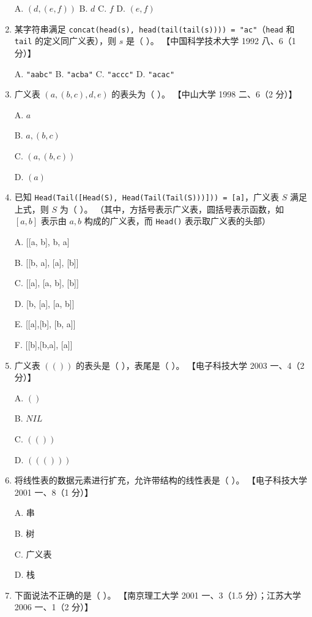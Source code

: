 \documentclass[lang=cn,newtx,10pt,scheme=chinese]{../../elegantbook}
\begin{document}
\begin{enumerate}
    A. $(d, (e, f))$ \quad B. $d$ \quad C. $f$ \quad D. $(e, f)$  

    \item 某字符串满足 \texttt{concat(head(s), head(tail(tail(s)))) = "ac"}（\texttt{head} 和 \texttt{tail} 的定义同广义表），则 $s$ 是（ ）。  
    【中国科学技术大学 1992 八、6（1 分）】  

    A. \texttt{"aabc"} \quad B. \texttt{"acba"} \quad C. \texttt{"accc"} \quad D. \texttt{"acac"}  

    \item 广义表 $(a, (b, c), d, e)$ 的表头为（ ）。  
    【中山大学 1998 二、6（2 分）】  

    A. $a$  

    B. $a, (b, c)$  

    C. $(a, (b, c))$  

    D. $(a)$  

    \item 已知 \texttt{Head(Tail([Head(S), Head(Tail(Tail(S)))])) = [a]}，广义表 $S$ 满足上式，则 $S$ 为（ ）。  
    （其中，方括号表示广义表，圆括号表示函数，如 $[a, b]$ 表示由 $a, b$ 构成的广义表，而 \texttt{Head()} 表示取广义表的头部）  

    A. [[a, b], b, a]  

    B. [[b, a], [a], [b]]  

    C. [[a], [a, b], [b]]  

    D. [b, [a], [a, b]]  

    E. [[a],[b], [b, a]]  

    F. [[b],[b,a], [a]]


    \item 广义表 $(( ))$ 的表头是（ ），表尾是（ ）。  
    【电子科技大学 2003 一、4（2 分）】  

    A. $()$  

    B. $NIL$

    C. $(())$ 

    D. $((()))$  

    \item 将线性表的数据元素进行扩充，允许带结构的线性表是（ ）。  
    【电子科技大学 2001 一、8（1 分）】  

    A. 串  

    B. 树  

    C. 广义表  

    D. 栈  

    \item 下面说法不正确的是（ ）。  
    【南京理工大学 2001 一、3（1.5 分）；江苏大学 2006 一、1（2 分）】 


\end{enumerate}
\end{document}
